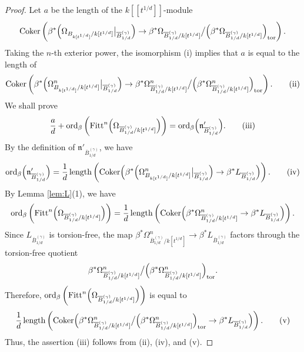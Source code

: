 \documentclass[a4paper,11pt]{amsart}
\theoremstyle{definition}
\theoremstyle{remark}
\begin{document}
\begin{proof}
Let $a$ be the length of the $k[[t^{1/d}]]$-module
\[
\operatorname{Coker} \left( \beta ^* \Bigl( \Omega _{B_{k[t^{1/d}]}/k[t^{1/d}]} \big|_{\overline{B}^{(\gamma)}_{1/d}} \Bigr) \to \beta ^* \Omega _{\overline{B}^{(\gamma)}_{1/d} /k[t^{1/d}]} \big/ \Bigl( \beta ^* \Omega _{\overline{B}^{(\gamma)}_{1/d} /k[t^{1/d}]} \Bigr)_{\rm tor} \right).
\]
Taking the $n$-th exterior power, the isomorphism (i) implies that $a$ is equal to the length of 
\[
\operatorname{Coker} \left( \beta ^* \Bigl( \Omega^n _{B_{k[t^{1/d}]}/k[t^{1/d}]} \big|_{\overline{B}^{(\gamma)}_{1/d}} \Bigr) \to \beta ^* \Omega^n _{\overline{B}^{(\gamma)}_{1/d} /k[t^{1/d}]} \big/ \Bigl( \beta ^* \Omega^n _{\overline{B}^{(\gamma)}_{1/d} / k[t^{1/d}]} \Bigr)_{\rm tor} \right). \tag{ii}
\]
We shall prove 
\[
\frac{a}{d} + 
\operatorname{ord}_{\beta} \left( \operatorname{Fitt}^n \Bigl( \Omega _{\overline{B}^{(\gamma)}_{1/d}/k[t^{1/d}]} \Bigr) \right)
= \operatorname{ord}_{\beta} \Bigl( \mathfrak{n}'_{\overline{B}^{(\gamma)}_{1/d}} \Bigr). \tag{iii}
\]
By the definition of $\mathfrak{n}'_{\overline{B}^{(\gamma)}_{1/d}}$, we have 
\[
\operatorname{ord}_{\beta} \Bigl( \mathfrak{n}'_{\overline{B}^{(\gamma)}_{1/d}} \Bigr) 
= \frac{1}{d} \operatorname{length} \left( \operatorname{Coker} \Bigl( \beta^* \Bigl( \Omega^n _{B_{k[t^{1/d}]}/k[t^{1/d}]} \big|_{\overline{B}^{(\gamma)}_{1/d}} \Bigr ) \to \beta ^* L_{\overline{B}^{(\gamma)}_{1/d}} \Bigr) \right). \tag{iv}
\]
By Lemma \ref{lem:L}(1),  we have
\[
\operatorname{ord}_{\beta} \left( \operatorname{Fitt}^n \Bigl( \Omega _{\overline{B}^{(\gamma)}_{1/d}/k[t^{1/d}]} \Bigr) \right)
= 
\frac{1}{d} \operatorname{length} \left( \operatorname{Coker} \Bigl( \beta ^* \Omega^n _{\overline{B}^{(\gamma)}_{1/d} /k[t^{1/d}]} \to \beta ^* L_{\overline{B}^{(\gamma)}_{1/d}} \Bigr) \right ) .
\]
Since $L_{\overline{B}^{(\gamma)}_{1/d}}$ is torsion-free, the map $\beta ^* \Omega^n _{\overline{B}^{(\gamma)}_{1/d} /k[t^{1/d}]} \to \beta ^* L_{\overline{B}^{(\gamma)}_{1/d}}$ factors through the torsion-free quotient
\[
\beta ^* \Omega^n _{\overline{B}^{(\gamma)}_{1/d} /k[t^{1/d}]} \big/ \Bigl( \beta ^* \Omega^n _{\overline{B}^{(\gamma)}_{1/d} /k[t^{1/d}]} \Bigr)_{\rm tor}. 
\]
Therefore, $\operatorname{ord}_{\beta} \left( \operatorname{Fitt}^n \Bigl( \Omega _{\overline{B}^{(\gamma)}_{1/d}/k[t^{1/d}]} \Bigr) \right)$ is equal to 
\[
\frac{1}{d} \operatorname{length} \left( \operatorname{Coker} \Bigl( \beta ^* \Omega^n _{\overline{B}^{(\gamma)}_{1/d} /k[t^{1/d}]} \big/ \Bigl( \beta ^* \Omega^n _{\overline{B}^{(\gamma)}_{1/d} /k[t^{1/d}]} \Bigr)_{\rm tor} \to \beta ^* L_{\overline{B}^{(\gamma)}_{1/d}}  \Bigr) \right ) . \tag{v}
\]
Thus, the assertion (iii) follows from (ii), (iv), and (v). 



\end{proof}
\end{document}
